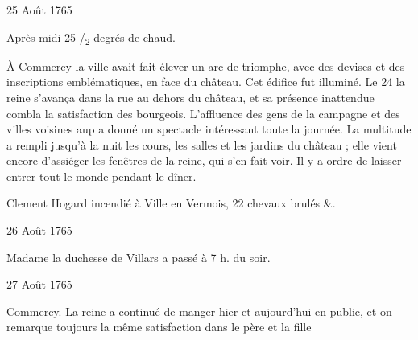                      \begin{diary}{25 Août 1765}{}


                           Après
                              midi
                           25 /\textsubscript{2} degrés de chaud. \bigskip


                         À Commercy la ville avait fait élever
                           un arc de triomphe, avec des devises et des
                           inscriptions emblématiques, en
                              face du
                              château. Cet édifice fut illuminé. Le 24
                           la reine s'avança
                           dans la rue au dehors
                           du château, et sa présence inattendue combla
                           la satisfaction des bourgeois. L'affluence
                           des gens de la campagne et des villes voisines
                           \sout{aup} a donné un spectacle intéressant
                           toute la journée. La multitude a rempli
                           jusqu'à la nuit les cours, les salles et les
                           jardins du château ; elle vient encore d'assiéger
                           les fenêtres de la
                              reine, qui s'en fait voir.
                           Il y a ordre de laisser entrer tout le monde
                           pendant le dîner. \bigskip



                           Clement
                           Hogard
                           incendié à Ville en Vermois,
                           22 chevaux brulés \&. \bigskip


                     \end{diary}

                     \begin{diary}{26 Août 1765}{}


                           Madame la duchesse de Villars a passé à
                           7 h. du soir. \bigskip


                     \end{diary}

                     \begin{diary}{27 Août 1765}{}


                           Commercy. La reine a continué de manger
                           hier et aujourd'hui en public, et on remarque
                           toujours la même satisfaction dans le père et la
                              fille
                        \bigskip


                     \end{diary}


